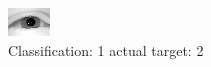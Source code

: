 \begin{figure}[h!]
\begin{center}
\includegraphics[width=0.60\columnwidth]{figures/ID2286_class_1_target_2.png}
\end{center}
\caption{ Classification: 1 actual target: 2}
\label{fig:ID2286_class_1_target_2}
\end{figure}
